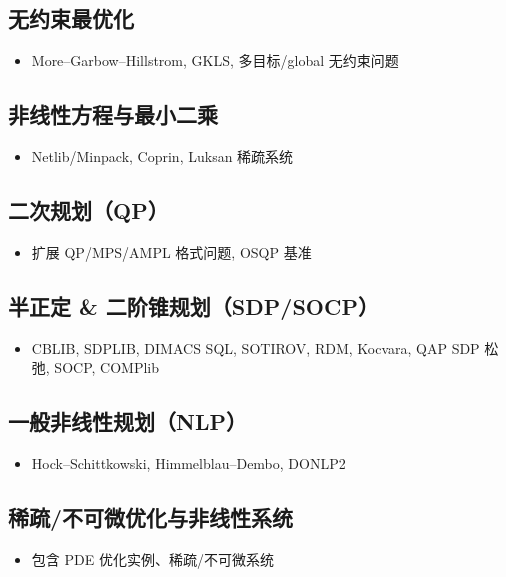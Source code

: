 \documentclass{article}
\begin{document}
\subsection{无约束最优化}
\begin{itemize}
  \item More–Garbow–Hillstrom, GKLS, 多目标/global 无约束问题
\end{itemize}

\subsection{非线性方程与最小二乘}
\begin{itemize}
  \item Netlib/Minpack, Coprin, Luksan 稀疏系统
\end{itemize}

\subsection{二次规划（QP）}
\begin{itemize}
  \item 扩展 QP/MPS/AMPL 格式问题, OSQP 基准
\end{itemize}

\subsection{半正定 \& 二阶锥规划（SDP/SOCP）}
\begin{itemize}
  \item CBLIB, SDPLIB, DIMACS SQL, SOTIROV, RDM, Kocvara, QAP SDP 松弛, SOCP, COMPlib
\end{itemize}

\subsection{一般非线性规划（NLP）}
\begin{itemize}
  \item Hock–Schittkowski, Himmelblau–Dembo, DONLP2
\end{itemize}

\subsection{稀疏/不可微优化与非线性系统}
\begin{itemize}
  \item 包含 PDE 优化实例、稀疏/不可微系统
\end{itemize}
\end{document}
